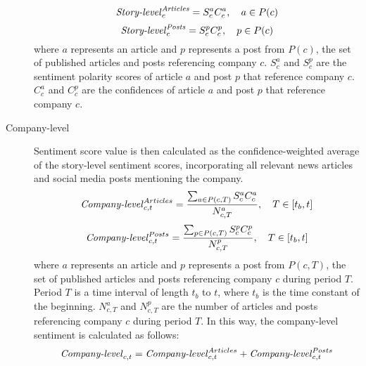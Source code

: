 \begin{description}
    \begin{equation}
    \label{eq:story-level-article-sentiment}
    \text{\textit{Story-level}}_{c}^{\text{\textit{Articles}}} = S_{c}^{a} C_{c}^{a}, \quad a \in P(c)
    \end{equation}
    \begin{equation}
    \label{eq:story-level-post-sentiment}
    \text{\textit{Story-level}}_{c}^{\text{\textit{Posts}}} = S_{c}^{p} C_{c}^{p}, \quad p \in P(c)
    \end{equation} where $a$ represents an article and $p$ represents a post from $P(c)$, the set of published articles and posts referencing company $c$. $S_{c}^{a}$ and $S_{c}^{p}$ are the sentiment polarity scores of article $a$ and post $p$ that reference company $c$. $C_{c}^{a}$ and $C_{c}^{p}$ are the confidences of article $a$ and post $p$ that reference company $c$.
    \item[Company-level] Sentiment score value is then calculated as the confidence-weighted average of the story-level sentiment scores, incorporating all relevant news articles and social media posts mentioning the company.
    \begin{equation}
        \label{eq:company-level-article-sentiment}
        \text{\textit{Company-level}}_{c,t}^{Articles} = \frac{\sum_{a \in P(c,T)} S_{c}^{a} C_{c}^{a}}{N_{c,T}^{a}}, \quad T \in [t_{b}, t]
    \end{equation}
    \begin{equation}
        \label{eq:company-level-post-sentiment}
        \text{\textit{Company-level}}_{c,t}^{Posts} = \frac{\sum_{p \in P(c,T)} S_{c}^{p} C_{c}^{p}}{N_{c,T}^{p}}, \quad T \in [t_{b}, t]
    \end{equation} where $a$ represents an article and $p$ represents a post from $P(c,T)$, the set of published articles and posts referencing company $c$ during period $T$. Period $T$ is a time interval of length $t_{b}$ to $t$, where $t_{b}$ is the time constant of the beginning. $N_{c,T}^{a}$ and $N_{c,T}^{p}$ are the number of articles and posts referencing company $c$ during period $T$. In this way, the company-level sentiment is calculated as follows:
    \begin{equation}
    \label{eq:company-level-sentiment}
    \text{\textit{Company-level}}_{c,t} = \text{\textit{Company-level}}_{c,t}^{Articles} + \text{\textit{Company-level}}_{c,t}^{Posts}
    \end{equation}
 \end{description}

